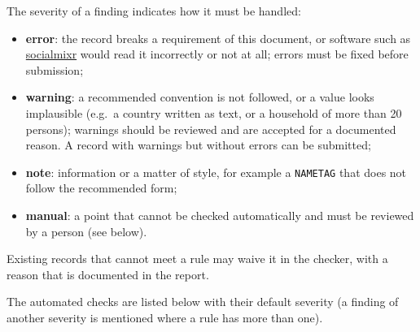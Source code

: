\documentclass[11pt,a4paper]{article}
\begin{document}
\medskip
\noindent The severity of a finding indicates how it must be handled:
\begin{itemize}
    \item \textbf{error}: the record breaks a requirement of this document, or software such as \href{https://cran.r-project.org/web/packages/socialmixr/index.html}{socialmixr} would read it incorrectly or not at all; errors must be fixed before submission;
    \item \textbf{warning}: a recommended convention is not followed, or a value looks implausible (e.g.\ a country written as text, or a household of more than 20 persons); warnings should be reviewed and are accepted for a documented reason. A record with warnings but without errors can be submitted;
    \item \textbf{note}: information or a matter of style, for example a \texttt{NAMETAG} that does not follow the recommended form;
    \item \textbf{manual}: a point that cannot be checked automatically and must be reviewed by a person (see below).
\end{itemize}
Existing records that cannot meet a rule may waive it in the checker, with a reason that is documented in the report.

\medskip
\noindent The automated checks are listed below with their default severity (a finding of another severity is mentioned where a rule has more than one).
\end{document}
